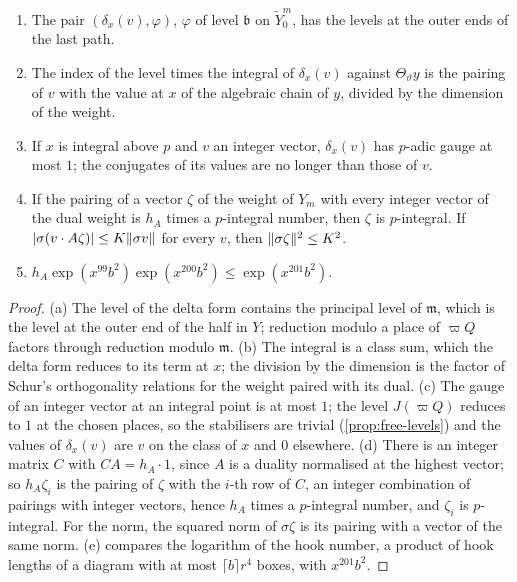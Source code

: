 \begin{lemma}\label{lem:delta-forms}
\begin{enumerate}[label=\textup{(\alph*)}]
\item The pair $(\delta_x(v),\varphi)$, $\varphi$ of level $\mathfrak b$ on $\tilde Y^m_0$, has the levels at the outer ends of the last path.
\item The index of the level times the integral of $\delta_x(v)$ against $\Theta_\vartheta y$ is the pairing of $v$ with the value at $x$ of the algebraic chain of $y$, divided by the dimension of the weight.
\item If $x$ is integral above $p$ and $v$ an integer vector, $\delta_x(v)$ has $p$-adic gauge at most $1$; the conjugates of its values are no longer than those of $v$.
\item If the pairing of a vector $\zeta$ of the weight of $Y_m$ with every integer vector of the dual weight is $h_A$ times a $p$-integral number, then $\zeta$ is $p$-integral. If $\lvert \sigma(v\cdot A\zeta)\rvert\le K\lVert \sigma v\rVert$ for every $v$, then
$\lVert \sigma\zeta\rVert^2\le K^2$.
\item $h_A\exp(x^{99}b^2)\exp(x^{200}b^2)\le\exp(x^{201}b^2)$.
\end{enumerate}
\end{lemma}

\begin{proof}
(a) The level of the delta form contains the principal level of $\mathfrak m$, which is the level at the outer end of the half in $Y$; reduction modulo a place of $\varpi Q$ factors through reduction modulo $\mathfrak m$. (b) The integral is a
class sum, which the delta form reduces to its term at $x$; the division by the dimension is the factor of Schur's orthogonality relations for the weight paired with its dual. (c) The gauge of an integer vector at an integral
point is at most $1$; the level $J(\varpi Q)$ reduces to $1$ at the chosen places, so the stabilisers are trivial (\cref{prop:free-levels}) and the values of $\delta_x(v)$ are
$v$ on the class of $x$ and $0$ elsewhere. (d) There is an integer matrix $C$ with $CA=h_A\cdot1$, since $A$ is a duality normalised at the highest vector; so $h_A\zeta_i$ is the pairing of $\zeta$ with the
$i$-th row of $C$, an integer combination of pairings with integer vectors, hence $h_A$ times a $p$-integral number, and $\zeta_i$ is $p$-integral. For the norm, the squared norm of $\sigma\zeta$ is its pairing with a vector of the
same norm. (e) compares the logarithm of the hook number, a product of hook lengths of a diagram with at most $\lceil b\rceil r^4$ boxes, with $x^{201}b^2$.
\end{proof}

